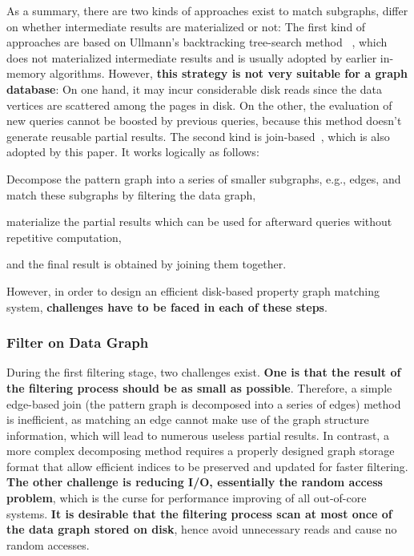As a summary, there are two kinds of approaches exist to match subgraphs,
differ on whether intermediate results are materialized or not:
The first kind of approaches are based on Ullmann's backtracking tree-search method
~\cite{DBLP:journals/jacm/Ullmann76,DBLP:journals/pvldb/LeeHKL12,DBLP:conf/sigmod/HanLL13,DBLP:conf/sigmod/KimLBHLKJ16},
which does not materialized intermediate results and is usually adopted by earlier in-memory algorithms.
However, \textbf{this strategy is not very suitable for a graph database}:
On one hand, it may incur considerable disk reads since the data vertices are scattered among the pages in disk.
On the other, the evaluation of new queries cannot be boosted by previous queries, because this method doesn't generate reusable partial results.
The second kind is join-based~\cite{DBLP:conf/sigmod/ShaoCCMYX14,DBLP:journals/pvldb/LaiQLC15,DBLP:journals/pvldb/QiaoZC17}, which is also adopted by this paper.
It works logically as follows:
\begin{enumerate*}[label={(\arabic*)}]
\item Decompose the pattern graph into a series of smaller subgraphs, e.g., edges,
  and match these subgraphs by filtering the data graph,
\item materialize the partial results which can be used for afterward queries without repetitive computation,
\item and the final result is obtained by joining them together.
\end{enumerate*}
However, in order to design an efficient disk-based property graph matching system,
\textbf{challenges have to be faced in each of these steps}.
\subsubsection*{Filter on Data Graph}
During the first filtering stage, two challenges exist.
\textbf{One is that the result of the filtering process should be as small as possible}.
Therefore, a simple edge-based join (the pattern graph is decomposed into a series of edges) method is inefficient,
as matching an edge cannot make use of the graph structure information,
which will lead to numerous useless partial results.
In contrast, a more complex decomposing method requires a properly designed graph storage format that allow efficient indices to be preserved and updated for faster filtering.
\textbf{The other challenge is reducing I/O, essentially the random access problem},
which is the curse for performance improving of all out-of-core systems.
\textbf{It is desirable that the filtering process scan at most once of the data graph stored on disk},
hence avoid unnecessary reads and cause no random accesses.

